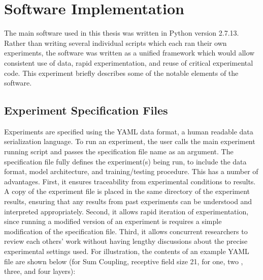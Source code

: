 
\chapter{Software Implementation}
\label{appendix:implementation}

The main software used in this thesis was written in Python version 2.7.13.
Rather than writing several individual scripts which each ran their own experiments, the software was written as a unified framework which would allow consistent use of data, rapid experimentation, and reuse of critical experimental code.
This experiment briefly describes some of the notable elements of the software.

\section{Experiment Specification Files}

Experiments are specified using the YAML data format, a human readable data serialization language. 
To run an experiment, the user calls the main experiment running script and passes the specification file name as an argument.
The specification file fully defines the experiment(s) being run, to include the data format, model architecture, and training/testing procedure. 
This has a number of advantages.
First, it ensures traceability from experimental conditions to results. 
A copy of the experiment file is placed in the same directory of the experiment results, ensuring that any results from past experiments can be understood and interpreted appropriately.
Second, it allows rapid iteration of experimentation, since running a modified version of an experiment is requires a simple modification of the specification file.
Third, it allows concurrent researchers to review each others' work without having lengthy discussions about the precise experimental settings used.
For illustration, the contents of an example YAML file are shown below (for Sum Coupling, receptive field size 21, for one, two , three, and four layers):


